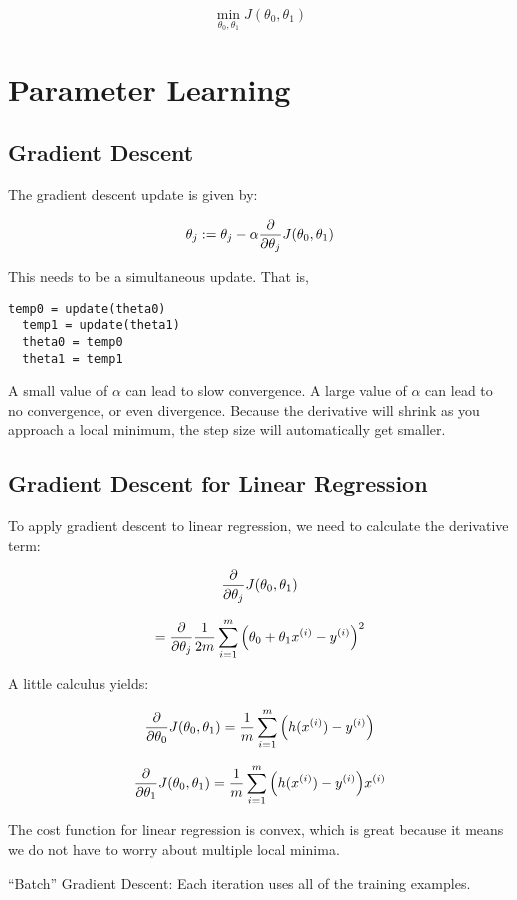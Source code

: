 \[ \min_{\theta_0, \theta_1} J(\theta_0, \theta_1) \]

\section{Parameter Learning}

\subsection{Gradient Descent}

The gradient descent update is given by:

\[ \theta_j := \theta_j - \alpha \pdv{\theta_j} J(\theta_0, \theta_1) \]

This needs to be a simultaneous update.  That is,

\begin{lstlisting}[style=Matlab-editor]
  temp0 = update(theta0)
  temp1 = update(theta1)
  theta0 = temp0
  theta1 = temp1
\end{lstlisting}

A small value of $\alpha$ can lead to slow convergence.
A large value of $\alpha$ can lead to no convergence, or even divergence.
Because the derivative will shrink as you approach a local minimum, the step size will automatically get smaller.

\subsection{Gradient Descent for Linear Regression}

To apply gradient descent to linear regression, we need to calculate the derivative term:

\[ \pdv{\theta_j} J(\theta_0, \theta_1) \]

\[ = \pdv{\theta_j} \frac{1}{2m} \sum_{i=1}^m \qty(\theta_0 + \theta_1 x^{(i)} - y^{(i)})^2 \]

A little calculus yields:

\[ \pdv{\theta_0} J(\theta_0, \theta_1)  = \frac{1}{m} \sum_{i=1}^m \qty(h(x^{(i)}) - y^{(i)}) \]

\[ \pdv{\theta_1} J(\theta_0, \theta_1)  = \frac{1}{m} \sum_{i=1}^m \qty(h(x^{(i)}) - y^{(i)}) x^{(i)} \]

The cost function for linear regression is convex, which is great because 
it means we do not have to worry about multiple local minima.

``Batch'' Gradient Descent: Each iteration uses all of the training examples.

